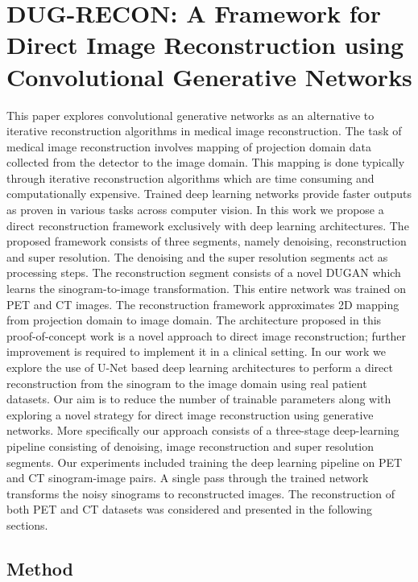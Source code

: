
\chapter{DUG-RECON: A Framework for Direct Image Reconstruction using Convolutional Generative Networks} %
\label{Chapter4} %


This paper explores convolutional generative networks as an alternative to iterative reconstruction algorithms in medical image reconstruction. The task of medical image reconstruction involves mapping of projection domain data collected from the detector to the image domain. This mapping is done typically through iterative reconstruction algorithms which are time consuming and computationally expensive. Trained deep learning networks provide faster outputs as proven in various tasks across computer vision. In this work we propose a direct reconstruction framework exclusively with deep learning architectures. The proposed framework consists of three segments, namely denoising, reconstruction and super resolution. The denoising and the super resolution segments act as processing steps. The reconstruction segment consists of a novel \ac{DUGAN} which learns the sinogram-to-image transformation. This entire network was trained on \ac{PET} and \ac{CT} images. The reconstruction framework approximates \ac{2D} mapping from projection domain to image domain. The architecture proposed in this proof-of-concept work is a novel approach to direct image reconstruction; further improvement is required to implement it in a clinical setting. In our work we explore the use of U-Net  based deep learning architectures \cite{ronneberger2015u} to perform a direct reconstruction from the sinogram to the image domain using real patient datasets. Our aim is to reduce the number of trainable parameters along with exploring a novel strategy for direct image reconstruction using generative networks. More specifically our approach consists of a three-stage deep-learning pipeline consisting of denoising, image reconstruction and super resolution segments. Our experiments included training the deep learning pipeline on \ac{PET} and \ac{CT} sinogram-image pairs. A single pass through the trained network transforms the noisy sinograms to reconstructed images. The reconstruction of both \ac{PET} and \ac{CT} datasets was considered and presented in the following sections.

\section{Method}

